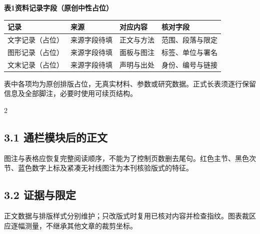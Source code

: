 \documentclass[UTF8,fontset=none,scheme=plain]{ctexart}
\begin{document}
\begingroup\setlength{\fboxsep}{6bp}\noindent\colorbox{CVRCream}{\begin{minipage}{\dimexpr\textwidth-12bp\relax}
{\bfseries\color{CVRRed}表1}\quad\textbf{资料记录字段（原创中性占位）}\par\vspace{6bp}
{\fontsize{7.8bp}{10.2bp}\selectfont{}
\begin{tabularx}{\linewidth}{@{}>{\raggedright\arraybackslash}p{.21\linewidth}XXX@{}}\hline
\rowcolor{white}\textbf{记录} & \textbf{来源} & \textbf{对应内容} & \textbf{核对字段}\\\hline
\rowcolor{white}文字记录（占位） & 来源字段待填 & 正文与方法 & 范围、段落与限定\\
\rowcolor{white}图形记录（占位） & 来源字段待填 & 面板与图注 & 标签、单位与署名\\
\rowcolor{white}文末记录（占位） & 来源字段待填 & 声明与出处 & 身份、编号与链接\\\hline
\end{tabularx}\par\vspace{4bp}
表中各项均为原创排版占位，无真实材料、参数或研究数据。正式长表须逐行保留信息及全部脚注，必要时使用可续页结构。\par}
\end{minipage}}\endgroup\vspace{8bp}
\begin{multicols}{2}
\subsection*{3.1 通栏模块后的正文}
图注与表格应恢复完整阅读顺序，不能为了控制页数删去尾句。红色主节、黑色次节、蓝色数字上标及紧凑无衬线图注为本刊核验版式的特征。
\subsection*{3.2 证据与限定}
正文数据与排版样式分别维护；只改版式时复用已核对内容并检查指纹。图表裁区应逐幅测量，不继承其他文章的裁剪坐标。
\end{multicols}
\clearpage
\end{document}
